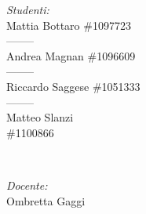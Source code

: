 \begin{titlepage}
	\begin{minipage}{0.4\textwidth}
	\begin{flushleft} \large
	\emph{Studenti:}\\
	Mattia Bottaro \#1097723 \\--------\\ Andrea Magnan \#1096609 \\--------\\ Riccardo Saggese \#1051333 \\--------\\ Matteo Slanzi \\ \#1100866
	\end{flushleft}
	\end{minipage}
	~
	\begin{minipage}{0.4\textwidth}
	\begin{flushright} \large
	\emph{Docente:} \\
	Ombretta Gaggi
	\end{flushright}
	\end{minipage}\\[2cm]
	
	
	
	
	
	
	
	\vfill %
	
	\end{titlepage}
	\newpage
